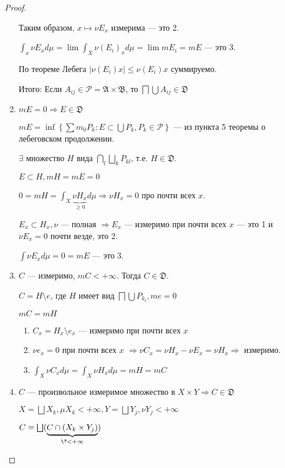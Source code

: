 \begin{proof}
\begin{enumerate}
              Таким образом, \(x \mapsto \nu E_x\) измерима --- это 2.

              \(\int_x \nu E_x d\mu = \lim \int_X \nu(E_i)_x d\mu = \lim m E_i = m E\) --- это 3.

              По теореме Лебега %
              \(|\nu(E_i) x| \leq \nu(E_i)x\) суммируемо.

              Итого: Если \(A_{ij}\in \mathcal{P}  = \mathfrak{A} \times \mathfrak{B}\), то \(\bigsqcap \bigcup A_{ij} \in \mathfrak{D}\)

        \item \(m E = 0 \Rightarrow E \in \mathfrak{D}\)

              \(m E = \inf \left\{\sum m_0 P_k : E \subset \bigcup P_k, P_k \in \mathcal{P}\right\} \) --- из пункта 5 теоремы о лебеговском продолжении.

              \(\exists \) множество \(H\) вида \(\bigcap_l \bigsqcup_k P_{kl}\), т.е. \(H\in \mathfrak{D}\).

              \(E\subset H, m H = m E = 0\)

              \(0 = mH = \int_X \underbrace{\nu H_x}_{ \geq 0} d\mu \Rightarrow \nu H_x = 0\) про почти всех \(x\).

              \(E_x \subset H_x, \nu\) --- полная \( \Rightarrow E_x\) --- измеримо при почти всех \(x\) --- это 1 и \(\nu E_x = 0\) почти везде, это 2.

              \(\int \nu E_x d\mu = 0 = m E\) --- это 3.

        \item \(C\) --- измеримо, \(mC < +\infty\). Тогда \(C\in \mathfrak{D}\).

              \(C = H \setminus e\), где \(H\) имеет вид \(\bigsqcap \bigcup P_{k_l}, me = 0\)

              \(mC = mH\)

              \begin{enumerate}
                  \item \(C_x = H_x \setminus e_x\) --- измеримо при почти всех \(x\)
                  \item \(\nu e_x = 0\) при почти всех \(x\) \( \Rightarrow \nu C_x = \nu H_x - \nu E_x = \nu H_x \Rightarrow \) измеримо.
                  \item \(\int_X \nu C_x d\mu = \int_X \nu H_x d\mu = mH = mC\)
              \end{enumerate}

        \item \(C\) --- произвольное измеримое множество в \(X \times Y \Rightarrow C \in \mathfrak{D}\)

              \(X = \bigsqcup X_k, \mu X_k < +\infty, Y = \bigsqcup Y_j, \nu Y_j < +\infty\)

              \(C = \bigsqcup (\underbrace{C \cap (X_k \times Y_j)}_{\? < +\infty})\) \? %
    \end{enumerate}
\end{proof}

